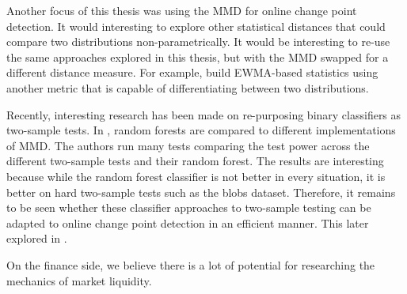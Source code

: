 Another focus of this thesis was using the MMD for online change point detection. It would interesting to explore other statistical distances that could compare two distributions non-parametrically. It would be interesting to re-use the same approaches explored in this thesis, but with the MMD swapped for a different distance measure. For example, build EWMA-based statistics using another metric that is capable of differentiating between two distributions. 

Recently, interesting research has been made on re-purposing binary classifiers as two-sample tests. In \cite{hediger2019use}, random forests are compared to different implementations of MMD. The authors run many tests comparing the test power across the different two-sample tests and their random forest. The results are interesting because while the random forest classifier is not better in every situation, it is better on hard two-sample tests such as the blobs dataset. Therefore, it remains to be seen whether these classifier approaches to two-sample testing can be adapted to online change point detection in an efficient manner. This later explored in \cite{lopez2016revisiting}.

On the finance side, we believe there is a lot of potential for researching the mechanics of market liquidity. 